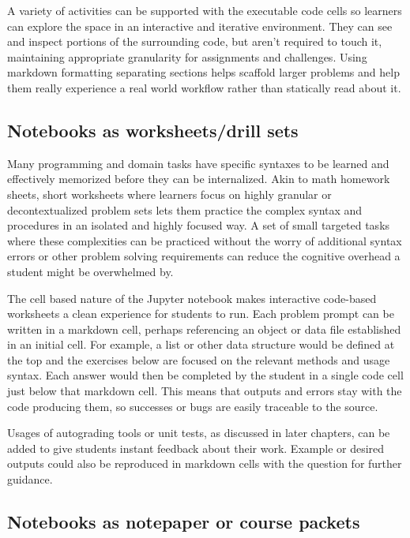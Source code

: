 \documentclass[]{book}
\begin{document}
A variety of activities can be supported with the executable code cells
so learners can explore the space in an interactive and iterative
environment. They can see and inspect portions of the surrounding code,
but aren't required to touch it, maintaining appropriate granularity for
assignments and challenges. Using markdown formatting separating
sections helps scaffold larger problems and help them really experience
a real world workflow rather than statically read about it.

\subsection{Notebooks as worksheets/drill
sets}\label{notebooks-as-worksheetsdrill-sets}

Many programming and domain tasks have specific syntaxes to be learned
and effectively memorized before they can be internalized. Akin to math
homework sheets, short worksheets where learners focus on highly
granular or decontextualized problem sets lets them practice the complex
syntax and procedures in an isolated and highly focused way. A set of
small targeted tasks where these complexities can be practiced without
the worry of additional syntax errors or other problem solving
requirements can reduce the cognitive overhead a student might be
overwhelmed by.

The cell based nature of the Jupyter notebook makes interactive
code-based worksheets a clean experience for students to run. Each
problem prompt can be written in a markdown cell, perhaps referencing an
object or data file established in an initial cell. For example, a list
or other data structure would be defined at the top and the exercises
below are focused on the relevant methods and usage syntax. Each answer
would then be completed by the student in a single code cell just below
that markdown cell. This means that outputs and errors stay with the
code producing them, so successes or bugs are easily traceable to the
source.

Usages of autograding tools or unit tests, as discussed in later
chapters, can be added to give students instant feedback about their
work. Example or desired outputs could also be reproduced in markdown
cells with the question for further guidance.

\subsection{Notebooks as notepaper or course
packets}\label{notebooks-as-notepaper-or-course-packets}
\end{document}
